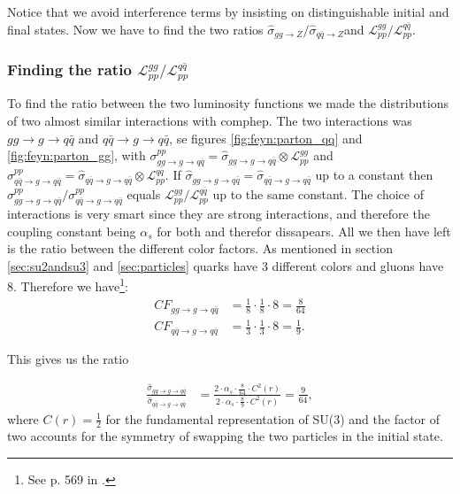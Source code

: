 Notice that we avoid interference terms by insisting on distinguishable initial and final states. Now we have to find the two ratios ${\hat \sigma_{gg \rightarrow Z}}/{\hat \sigma_{q \bar q \rightarrow Z}}$and ${\mathcal{L}_{pp}^{gg}}/{\mathcal{L}_{pp}^{q \bar q}}$.


\subsubsection{Finding the ratio ${\mathcal{L}_{pp}^{gg}}/{\mathcal{L}_{pp}^{q \bar q}}$}
To find the ratio between the two luminosity functions we made the distributions of two almost similar interactions with comphep. The two interactions was  $gg \rightarrow g \rightarrow q \bar q$ and $q \bar q \rightarrow g \rightarrow q \bar q$, se figures \ref{fig:feyn:parton_qq} and \ref{fig:feyn:parton_gg}, with  $\sigma^{pp}_{gg \rightarrow g \rightarrow q \bar q}=\hat \sigma_{gg \rightarrow g \rightarrow q \bar q} \otimes \mathcal{L}_{pp}^{gg}$ and $\sigma^{pp}_{q \bar q \rightarrow g \rightarrow q \bar q}= \hat \sigma_{q \bar q \rightarrow g \rightarrow q \bar q} \otimes \mathcal{L}_{pp}^{q \bar q}$. If $\hat \sigma_{gg \rightarrow g \rightarrow q \bar q} = \hat \sigma_{q \bar q \rightarrow g \rightarrow q \bar q}$ up to a constant then $\sigma^{pp}_{gg \rightarrow g \rightarrow q \bar q}/\sigma^{pp}_{q \bar q \rightarrow g \rightarrow q \bar q}$ equals $\mathcal{L}_{pp}^{gg}/\mathcal{L}_{pp}^{q \bar q}$ up to the same constant. The choice of interactions is very smart since they are strong interactions, and therefore the coupling constant being $\alpha_{s}$ for both and therefor dissapears. All we then have left is the ratio between the different color factors.
As mentioned in section \ref{sec:su2andsu3} and \ref{sec:particles} quarks have 3 different colors and gluons have 8. Therefore we have\footnote{See p. 569 in  \cite{peskin1993iqf}.}:
\begin{align}
	CF_{gg \rightarrow g \rightarrow q \bar q}&=\frac{1}{8} \cdot \frac{1}{8} \cdot 8=\frac{8}{64}\\
	CF_{q \bar q \rightarrow g \rightarrow q \bar q}&=\frac{1}{3} \cdot \frac{1}{3} \cdot 8=\frac{1}{9}.
\end{align}

This gives us the ratio

\begin{align}
	\frac{\hat \sigma_{gg \rightarrow g \rightarrow q \bar q}}{\hat \sigma_{q \bar q \rightarrow g \rightarrow q \bar q}} &=\frac{2 \cdot \alpha_{s} \cdot \frac{8}{64} \cdot C^{2}(r)}{2 \cdot \alpha_{s} \cdot \frac{8}{9} \cdot C^{2}(r)}=\frac{9}{64},
\end{align}
where $C(r) = \frac{1}{2}$\cite{peskin1993iqf} for the fundamental representation of SU(3) and the factor of two accounts for the symmetry of swapping the two particles in the initial state.

